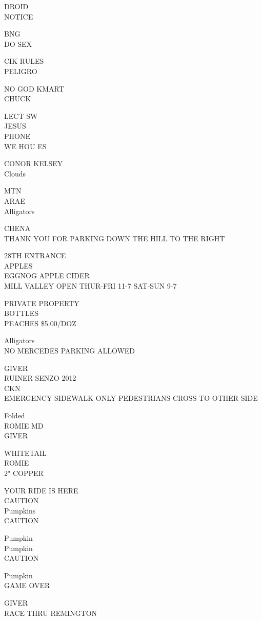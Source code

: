 \documentclass[10pt,letterpaper]{article}
\begin{document}
DROID\\
NOTICE

BNG\\
DO SEX

CIK RULES\\
PELIGRO

NO GOD KMART\\
CHUCK

LECT SW\\
JESUS\\
PHONE\\
WE HOU ES

CONOR KELSEY\\
Clouds

MTN\\
ARAE\\
Alligators

CHENA\\
THANK YOU FOR PARKING DOWN THE HILL TO THE RIGHT

28TH ENTRANCE\\
APPLES\\
EGGNOG APPLE CIDER\\
MILL VALLEY OPEN THUR{-}FRI 11{-}7 SAT{-}SUN 9{-}7

PRIVATE PROPERTY\\
BOTTLES\\
PEACHES \$5.00/DOZ

Alligators\\
NO MERCEDES PARKING ALLOWED

GIVER\\
RUINER SENZO 2012\\
CKN\\
EMERGENCY SIDEWALK ONLY PEDESTRIANS CROSS TO OTHER SIDE

Folded\\
ROMIE MD\\
GIVER

WHITETAIL\\
ROMIE\\
2" COPPER

YOUR RIDE IS HERE\\
CAUTION\\
Pumpkins\\
CAUTION

Pumpkin\\
Pumpkin\\
CAUTION

Pumpkin\\
GAME OVER

GIVER\\
RACE THRU REMINGTON
\end{document}
